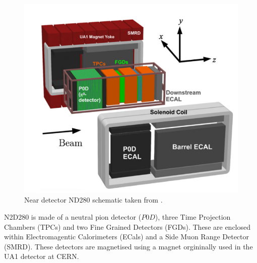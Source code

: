 \begin{figure}
    \includegraphics[width=\textwidth]{Figures/nd280_complex.png}
    \caption{Near detector ND280 schematic taken from \cite{t2k_collaboration_t2k_2011}.}
    \label{fig:ND280_schematic}
\end{figure}

N2D280 is made of a neutral pion detector ($P0D$), three Time Projection Chambers (TPCs) and two Fine Grained Detectors (FGDs). These are enclosed within Electromagentic Calorimeters (ECals) and a Side Muon Range Detector (SMRD). These detectors are magnetised using a magnet orgininally used in the UA1 detector at CERN. 

